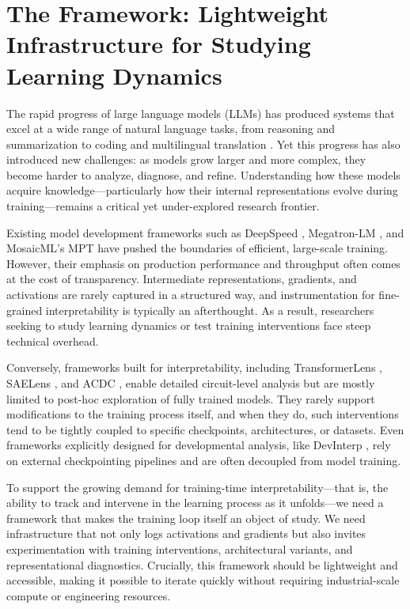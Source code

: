 \chapter{The \picosupabig Framework: Lightweight Infrastructure for Studying Learning Dynamics}
\label{sec:pico-intro}

The rapid progress of large language models (LLMs) has produced systems that excel at a wide range of natural language tasks, from reasoning and summarization to coding and multilingual translation \citep{hendrycks2021mmlu, cobbe2021gsm8k, srivastava2023bigbench}. Yet this progress has also introduced new challenges: as models grow larger and more complex, they become harder to analyze, diagnose, and refine. Understanding how these models acquire knowledge—particularly how their internal representations evolve during training—remains a critical yet under-explored research frontier.

Existing model development frameworks such as DeepSpeed \citep{rasley2020deepspeed}, Megatron-LM \citep{narayanan2021megatron}, and MosaicML's MPT \citep{mosaic2023mpt} have pushed the boundaries of efficient, large-scale training. However, their emphasis on production performance and throughput often comes at the cost of transparency. Intermediate representations, gradients, and activations are rarely captured in a structured way, and instrumentation for fine-grained interpretability is typically an afterthought. As a result, researchers seeking to study learning dynamics or test training interventions face steep technical overhead.

Conversely, frameworks built for interpretability, including TransformerLens \citep{nanda2022transformerlens}, SAELens \citep{bloom2024saelens}, and ACDC \citep{conmy2023towards}, enable detailed circuit-level analysis but are mostly limited to post-hoc exploration of fully trained models. They rarely support modifications to the training process itself, and when they do, such interventions tend to be tightly coupled to specific checkpoints, architectures, or datasets. Even frameworks explicitly designed for developmental analysis, like DevInterp \citep{devinterpcode}, rely on external checkpointing pipelines and are often decoupled from model training.

To support the growing demand for training-time interpretability—that is, the ability to track and intervene in the learning process as it unfolds—we need a framework that makes the training loop itself an object of study. We need infrastructure that not only logs activations and gradients but also invites experimentation with training interventions, architectural variants, and representational diagnostics. Crucially, this framework should be lightweight and accessible, making it possible to iterate quickly without requiring industrial-scale compute or engineering resources.

